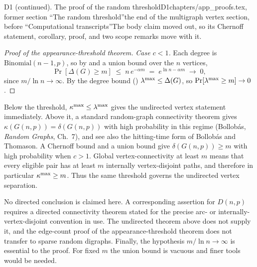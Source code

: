 \begin{offcut}{D1 (continued). The proof of the random threshold}{D1}{chapters/app\_proofs.tex, former section ``The random threshold''}{the end of the multigraph vertex section, before ``Computational transcripts''}{The body claim moved out, so its Chernoff statement, corollary, proof, and two scope remarks move with it.}
\begin{proof}[Proof of the appearance-threshold theorem]
\emph{Case $c < 1$.} Each degree is $\mathrm{Binomial}(n-1, p)$, so by  and a union bound over the $n$ vertices,
\[
\Pr[\Delta(G) \ge m] \;\le\; n\,e^{-\alpha m} \;=\; e^{\ln n - \alpha m} \;\to\; 0,
\]
since $m / \ln n \to \infty$. By the degree bound () $\lambda^{\max} \le \Delta(G)$, so $\Pr[\lambda^{\max} \ge m] \to 0$.
\end{proof}

\begin{remark}\label{rem:threshold-analogues}
Below the threshold, $\kappa^{\max} \le \lambda^{\max}$ gives the undirected vertex statement immediately. Above it, a standard random-graph connectivity theorem gives $\kappa(G(n,p))=\delta(G(n,p))$ with high probability in this regime (Bollob\'as, \emph{Random Graphs}, Ch.~7), and see also the hitting-time form of Bollob\'as and Thomason. A Chernoff bound and a union bound give $\delta(G(n,p))\ge m$ with high probability when $c>1$. Global vertex-connectivity at least $m$ means that every eligible pair has at least $m$ internally vertex-disjoint paths, and therefore in particular $\kappa^{\max}\ge m$. Thus the same threshold governs the undirected vertex separation.

No directed conclusion is claimed here. A corresponding assertion for $D(n,p)$ requires a directed connectivity theorem stated for the precise arc- or internally-vertex-disjoint convention in use. The undirected theorem above does not supply it, and the edge-count proof of the appearance-threshold theorem does not transfer to sparse random digraphs. Finally, the hypothesis $m/\ln n\to\infty$ is essential to the proof. For fixed $m$ the union bound is vacuous and finer tools would be needed.
\end{remark}


\end{offcut}
